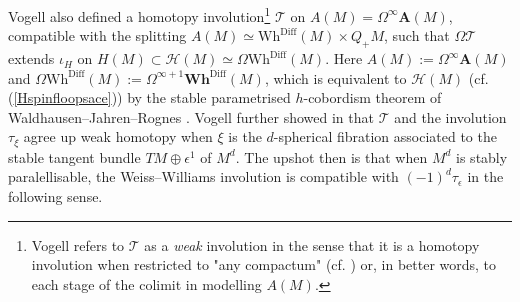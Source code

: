 \documentclass[a4paper, oneside]{amsart}
\newcommand{\diff}{\mathrm{Diff}}
\newcommand{\1}{\mathds{1}}
\newtheorem{lem}[thm]{Lemma}
\theoremstyle{remark}
\theoremstyle{definition}
\newcommand{\R}{{\scaleobj{0.97}{\mathbb{R}}}}
\newcommand{\Wh}{\mathrm{Wh}}
\newcommand{\Asp}{\mathbf{A}}
\newcommand{\Whsp}{\mathbf{Wh}^{\diff}}
\numberwithin{equation}{section}
\begin{document}
Vogell also defined \cite[p. 299]{VogellInvolution} a homotopy involution\footnote{Vogell refers to $\mathscr{T}$ as a \emph{weak} involution in the sense that it is a homotopy involution when restricted to "any compactum" (cf. \cite[Lem. 2.4]{VogellInvolution}) or, in better words, to each stage of the colimit in \cite[p. 299]{VogellInvolution} modelling $A(M)$.} $\mathscr T$ on $A(M)=\Omega^\infty \Asp(M)$, compatible with the splitting
$
A(M)\simeq \Wh^{\diff}(M)\times Q_+M
$,
such that $\Omega \mathscr T$ extends $\iota_H$ on $H(M)\subset\mathcal H(M)\simeq \Omega \Wh^{\diff}(M)$. Here $A(M):=\Omega^\infty\Asp(M)$ and $\Omega\Wh^\diff(M):=\Omega^{\infty+1}\Whsp(M)$, which is equivalent to $\mathcal{H}(M)$ (cf. (\ref{Hspinfloopsace})) by the stable parametrised $h$-cobordism theorem of Waldhausen--Jahren--Rognes \cite[Thm. 0.1]{RognesWald}. Vogell further showed in \cite[Cor. 2.10]{VogellInvolution} that $\mathscr T$ and the involution $\tau_\xi$ agree up weak homotopy when $\xi$ is the $d$-spherical fibration associated to the stable tangent bundle $TM\oplus \epsilon^1$ of $M^d$. The upshot then is that when $M^d$ is stably paralellisable, the Weiss--Williams involution is compatible with $(-1)^d\tau_\epsilon$ in the following sense.



\end{document}
